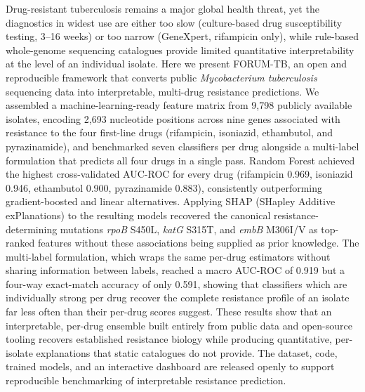 Drug-resistant tuberculosis remains a major global health threat, yet the diagnostics in widest use are either too slow (culture-based drug susceptibility testing, 3--16 weeks) or too narrow (GeneXpert, rifampicin only), while rule-based whole-genome sequencing catalogues provide limited quantitative interpretability at the level of an individual isolate. Here we present FORUM-TB, an open and reproducible framework that converts public \textit{Mycobacterium tuberculosis} sequencing data into interpretable, multi-drug resistance predictions. We assembled a machine-learning-ready feature matrix from 9{,}798 publicly available isolates, encoding 2{,}693 nucleotide positions across nine genes associated with resistance to the four first-line drugs (rifampicin, isoniazid, ethambutol, and pyrazinamide), and benchmarked seven classifiers per drug alongside a multi-label formulation that predicts all four drugs in a single pass. Random Forest achieved the highest cross-validated AUC-ROC for every drug (rifampicin 0.969, isoniazid 0.946, ethambutol 0.900, pyrazinamide 0.883), consistently outperforming gradient-boosted and linear alternatives. Applying SHAP (SHapley Additive exPlanations) to the resulting models recovered the canonical resistance-determining mutations \textit{rpoB} S450L, \textit{katG} S315T, and \textit{embB} M306I/V as top-ranked features without these associations being supplied as prior knowledge. The multi-label formulation, which wraps the same per-drug estimators without sharing information between labels, reached a macro AUC-ROC of 0.919 but a four-way exact-match accuracy of only 0.591, showing that classifiers which are individually strong per drug recover the complete resistance profile of an isolate far less often than their per-drug scores suggest. These results show that an interpretable, per-drug ensemble built entirely from public data and open-source tooling recovers established resistance biology while producing quantitative, per-isolate explanations that static catalogues do not provide. The dataset, code, trained models, and an interactive dashboard are released openly to support reproducible benchmarking of interpretable resistance prediction.
